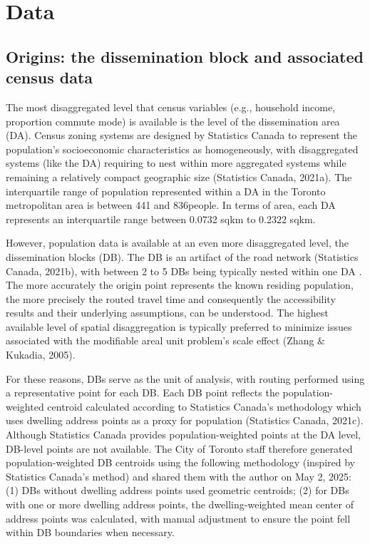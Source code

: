 \documentclass[
11pt, %
oneside, %
english, %
singlespacing, %
]{macthesis} %
\begin{document}
\section{Data}\label{data}

\subsection{Origins: the dissemination block and associated census data}\label{origins-the-dissemination-block-and-associated-census-data}

The most disaggregated level that census variables (e.g., household income, proportion commute mode) is available is the level of the dissemination area (DA). Census zoning systems are designed by Statistics Canada to represent the population's socioeconomic characteristics as homogeneously, with disaggregated systems (like the DA) requiring to nest within more aggregated systems while remaining a relatively compact geographic size (Statistics Canada, 2021a). The interquartile range of population represented within a DA in the Toronto metropolitan area is between 441 and 836people. In terms of area, each DA represents an interquartile range between 0.0732 sqkm to 0.2322 sqkm.

However, population data is available at an even more disaggregated level, the dissemination blocks (DB). The DB is an artifact of the road network (Statistics Canada, 2021b), with between 2 to 5 DBs being typically nested within one DA . The more accurately the origin point represents the known residing population, the more precisely the routed travel time and consequently the accessibility results and their underlying assumptions, can be understood. The highest available level of spatial disaggregation is typically preferred to minimize issues associated with the modifiable areal unit problem's scale effect (Zhang \& Kukadia, 2005).

For these reasons, DBs serve as the unit of analysis, with routing performed using a representative point for each DB. Each DB point reflects the population-weighted centroid calculated according to Statistics Canada's methodology which uses dwelling address points as a proxy for population (Statistics Canada, 2021c). Although Statistics Canada provides population-weighted points at the DA level, DB-level points are not available. The City of Toronto staff therefore generated population-weighted DB centroids using the following methodology (inspired by Statistics Canada's method) and shared them with the author on May 2, 2025: (1) DBs without dwelling address points used geometric centroids; (2) for DBs with one or more dwelling address points, the dwelling-weighted mean center of address points was calculated, with manual adjustment to ensure the point fell within DB boundaries when necessary.
\end{document}
